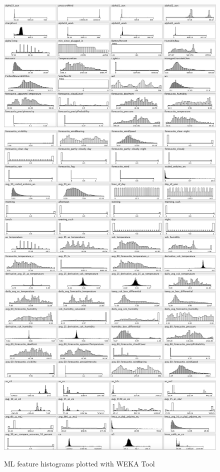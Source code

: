 \begin{figure}[!b]
 	\includegraphics[width=\textwidth-4cc]{weka/features1}  
	\includegraphics[width=\textwidth-4cc]{weka/features2}    
	\includegraphics[width=\textwidth-4cc]{weka/features3}  
	\includegraphics[width=\textwidth-4cc]{weka/features4}                  
         \caption{ML feature histograms plotted with WEKA Tool}
 	 \label{fig:weka_features}
\end{figure}



